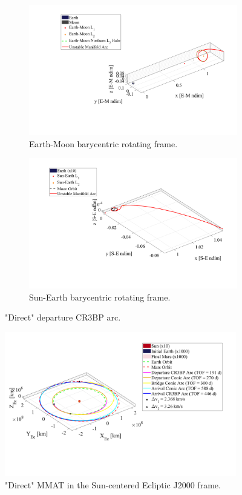 \begin{figure}[ht]
    \begin{subfigure}[h]{0.495\linewidth}
        \includegraphics[width=\textwidth]{figures/DirectEM.pdf}
        \caption{Earth-Moon barycentric rotating frame.}
    \end{subfigure}
    \hfill
    \begin{subfigure}[h]{0.495\linewidth}
        \includegraphics[width=\textwidth]{figures/DirectSE.pdf}
        \caption{Sun-Earth barycentric rotating frame.}
    \end{subfigure}
    \caption{"Direct" departure CR3BP arc.}
    \label{fig:directE}
\end{figure}

\begin{figure}[ht]
    \centering
    \includegraphics[width=0.9\textwidth]{figures/DirectMMAT.pdf}
    \caption{"Direct" MMAT in the Sun-centered Ecliptic J2000 frame.}
    \label{fig:directMMAT}
\end{figure}

